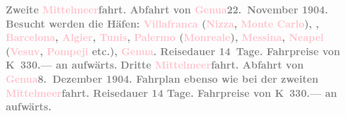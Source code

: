 \documentclass[twoside=false,titlepage=false,open=any, parskip=never, fontsize=12pt, headings=small, chapterprefix=false, appendixprefix=false]{scrbook}
\begin{document}
           \pstart
           \textcolor{gray}{\textbf{\textbf{Zweite \textcolor{pink}{Mittelmeer}{}\ledrightnote{\textcolor{pink}{Mittelmeer}}fahrt.}
                  Abfahrt von \textcolor{pink}{Genua}{}\ledrightnote{\textcolor{pink}{Genua}}{ }\textbf{22. November 1904}. Besucht werden die Häfen: \textcolor{pink}{Villafranca}{}\ledrightnote{\textcolor{pink}{Villefranche-sur-Mer}}
                     (\textcolor{pink}{Nizza}{}\ledrightnote{\textcolor{pink}{Nizza}}, \textcolor{pink}{Monte
                     Carlo}{}\ledrightnote{\textcolor{pink}{Monte Carlo}}), \label{T_L01495_1v}\label{T_L01495_1h}, \textcolor{pink}{Barcelona}{}\ledrightnote{\textcolor{pink}{Barcelona}}, \textcolor{pink}{Algier}{}\ledrightnote{\textcolor{pink}{Algiers}}, \textcolor{pink}{Tunis}{}\ledrightnote{\textcolor{pink}{Tunis}}, \textcolor{pink}{Palermo}{}\ledrightnote{\textcolor{pink}{Palermo}} (\textcolor{pink}{Monreale}{}\ledrightnote{\textcolor{pink}{Monreale}}), \textcolor{pink}{Messina}{}\ledrightnote{\textcolor{pink}{Messina}}, \textcolor{pink}{Neapel}{}\ledrightnote{\textcolor{pink}{Neapel}} (\textcolor{pink}{Vesuv}{}\ledrightnote{\textcolor{pink}{Vesuv}}, \textcolor{pink}{Pompeji}{}\ledrightnote{\textcolor{pink}{Pompei}} etc.), \textcolor{pink}{Genua}{}\ledrightnote{\textcolor{pink}{Genua}}. Reisedauer 14 Tage. Fahrpreise von \textbf{K 330.—} an aufwärts.}}\pend
           \pstart
           \textcolor{gray}{\textbf{\textbf{Dritte \textcolor{pink}{Mittelmeer}{}\ledrightnote{\textcolor{pink}{Mittelmeer}}fahrt.}
                  Abfahrt von \textcolor{pink}{Genua}{}\ledrightnote{\textcolor{pink}{Genua}}{ }\textbf{8. Dezember 1904}. Fahrplan ebenso wie bei der zweiten \textcolor{pink}{Mittelmeer}{}\ledrightnote{\textcolor{pink}{Mittelmeer}}fahrt. Reisedauer 14 Tage. Fahrpreise von \textbf{K 330.—} an aufwärts.}}\pend
           \pstart
\end{document}
